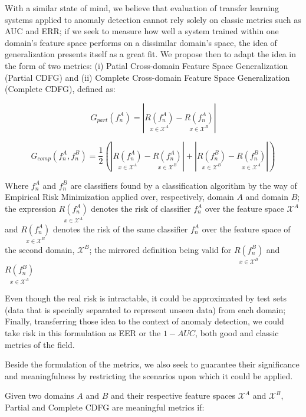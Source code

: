 With a similar state of mind, we believe that evaluation of transfer learning systems applied to anomaly detection cannot rely solely on classic metrics such as AUC and ERR; if we seek to measure how well a system trained within one domain's feature space performs on a dissimilar domain's space, the idea of generalization presents itself as a great fit. We propose then to adapt the idea in the form of two metrics: (i) Patial Cross-domain Feature Space Generalization (Partial CDFG) and (ii) Complete Cross-domain Feature Space Generalization (Complete CDFG), defined as:

\begin{equation}
    G_{part}(f_n^A) = |\underset{x \in \mathcal{X}^A}{R(f_n^A)} - \underset{x \in \mathcal{X}^B}{R(f_n^A)}|
\end{equation}

\begin{equation}
    G_{comp}(f_n^A, f_n^B) = \dfrac{1}{2}(|\underset{x \in \mathcal{X}^A}{R(f_n^A)} - \underset{x \in \mathcal{X}^B}{R(f_n^A)}| + |\underset{x \in \mathcal{X}^B}{R(f_n^B)} - \underset{x \in \mathcal{X}^A}{R(f_n^B)}|)
\end{equation}

Where $f_n^A$ and $f_n^B$ are classifiers found by a classification algorithm by the way of Empirical Risk Minimization applied over, respectively, domain $A$ and domain $B$; the expression $\underset{x \in \mathcal{X}^A}{R(f_n^A)}$ denotes the risk of classifier $f_n^A$ over the feature space $\mathcal{X}^A$ and $\underset{x \in \mathcal{X}^B}{R(f_n^A)}$ denotes the risk of the same classifier $f_n^A$ over the feature space of the second domain, $\mathcal{X}^B$; the mirrored definition being valid for $\underset{x \in \mathcal{X}^B}{R(f_n^B)}$ and $\underset{x \in \mathcal{X}^A}{R(f_n^B)}$

Even though the real risk is intractable, it could be approximated by test sets (data that is specially separated to represent unseen data) from each domain; Finally, transferring those idea to the context of anomaly detection, we could take risk in this formulation as EER or the $1-AUC$, both good and classic metrics of the field.

Beside the formulation of the metrics, we also seek to guarantee their significance and meaningfulness by restricting the scenarios upon which it could be applied. 

Given two domains $A$ and $B$ and their respective feature spaces $\mathcal{X}^A$ and $\mathcal{X}^B$, Partial and Complete CDFG are meaningful metrics if: 

